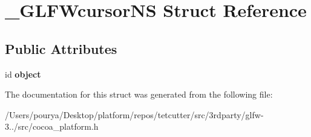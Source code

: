 \hypertarget{struct__GLFWcursorNS}{}\section{\+\_\+\+G\+L\+F\+Wcursor\+N\+S Struct Reference}
\label{struct__GLFWcursorNS}
\subsection*{Public Attributes}
\begin{DoxyCompactItemize}
\item 
\hypertarget{struct__GLFWcursorNS_a863a8b16c5105f5ccde6c2149d66373c}{}id {\bfseries object}\label{struct__GLFWcursorNS_a863a8b16c5105f5ccde6c2149d66373c}

\end{DoxyCompactItemize}


The documentation for this struct was generated from the following file\+:\begin{DoxyCompactItemize}
\item 
/\+Users/pourya/\+Desktop/platform/repos/tetcutter/src/3rdparty/glfw-\/3../src/cocoa\+\_\+platform.\+h\end{DoxyCompactItemize}

